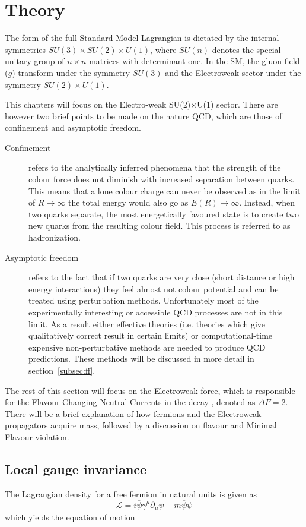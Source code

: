 \section{Theory}
The form of the full Standard Model Lagrangian is dictated by the internal symmetries $SU(3)\times SU(2)\times U(1)$, where $SU(n)$ denotes the special unitary group of $n \times n$ matrices with determinant one. In the SM, the gluon field ($g$) transform under the symmetry $SU(3)$ and the Electroweak sector under the symmetry $SU(2)\times U(1)$.

This chapters will focus on the Electro-weak SU(2)$\times$U(1) sector.  There are however two brief points to be made on the nature QCD, which are those of confinement and asymptotic freedom.

\begin{description}
\item [Confinement] refers to the analytically inferred phenomena that the  strength of the colour force does not diminish with increased separation between quarks. This means that a lone colour charge can never be observed as in the limit of $R\to \infty$ the total energy would also go as $E(R)\to \infty$. Instead, when two quarks separate, the most energetically favoured state is to create two new quarks from the resulting colour field. This process is referred to as hadronization.

\item[Asymptotic freedom] refers to the fact that if two quarks are very close (short distance or high energy interactions) they feel almost not colour potential and can be treated using perturbation methods. Unfortunately most of the experimentally interesting or accessible QCD processes are not in this limit. As a result either effective theories (i.e. theories which give qualitatively correct result in certain limits) or computational-time expensive non-perturbative methods are needed to produce QCD predictions. These methods will be discussed in more detail in section~\ref{subsec:ff}.
\end{description}
The rest of this section will focus on the Electroweak force, which is responsible for the Flavour Changing Neutral Currents in the decay \Lbpi, denoted as $\Delta F = 2$. There will be a brief explanation of how fermions and the Electroweak propagators acquire mass, followed by a discussion on flavour and Minimal Flavour violation.

\subsection{Local gauge invariance}
\label{subsec:gauge}
The Lagrangian density for a free fermion in natural units is given as
\begin{equation}
  \label{eq:L_free}
  \mathcal{L} = i\overline{\psi}\gamma^{\mu}\partial_{\mu}\psi - m\overline{\psi}\psi
\end{equation}
which yields the equation of motion

